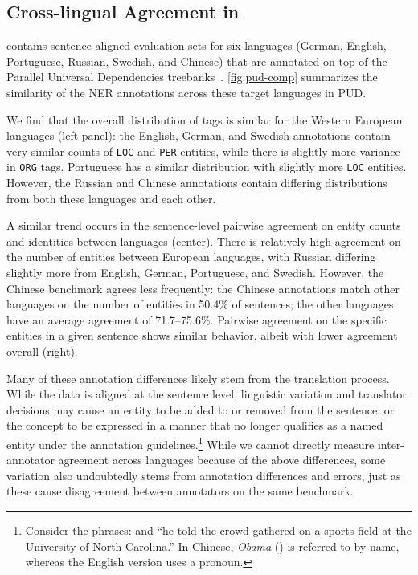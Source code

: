 \subsection{Cross-lingual Agreement in \shortname{}}
\label{ssection:pud-agreement}
\shortname{} contains sentence-aligned evaluation sets for six languages (German, English, Portuguese, Russian, Swedish, and Chinese) that are annotated on top of the Parallel Universal Dependencies treebanks~\cite[PUD; ][]{zeman-etal-2017-conll}. \autoref{fig:pud-comp} summarizes the similarity of the NER annotations across these target languages in PUD.

We find that the overall distribution of tags is similar for the Western European languages (left panel): the English, German, and Swedish annotations contain very similar counts of \texttt{LOC} and \texttt{PER} entities, while there is slightly more variance in \texttt{ORG} tags. Portuguese has a similar distribution with slightly more \texttt{LOC} entities.
However, the Russian and Chinese annotations contain differing distributions from both these languages and each other. 

A similar trend occurs in the sentence-level pairwise agreement on entity counts and identities between languages (center). There is relatively high agreement on the number of entities between European languages, with Russian differing slightly more from English, German, Portuguese, and Swedish. However, the Chinese benchmark agrees less frequently: the Chinese annotations match other languages on the number of entities in 50.4\% of sentences; the other languages have an average agreement of 71.7--75.6\%. Pairwise agreement on the specific entities in a given sentence shows similar behavior, albeit with lower agreement overall (right).

Many of these annotation differences likely stem from the translation process. While the data is aligned at the sentence level, linguistic variation and translator decisions may cause an entity to be added to or removed from the sentence, or the concept to be expressed in a manner that no longer qualifies as a named entity under the annotation guidelines.\footnote{Consider the phrases:   and ``he told the crowd gathered on a sports field at the University of North Carolina.'' In Chinese, \textit{Obama} () is referred to by name, whereas the English version uses a pronoun.} While we cannot directly measure inter-annotator agreement across languages because of the above differences, some variation also undoubtedly stems from annotation differences and errors, just as these cause disagreement between annotators on the same benchmark.

